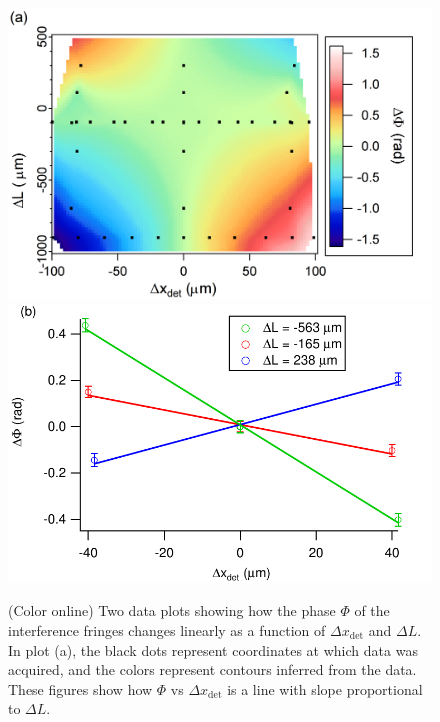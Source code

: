 \documentclass[twocolumn,pra,showpacs,superscriptaddress,longbibliography]{revtex4-1}   %
\begin{document}
\begin{figure}
\includegraphics[scale=0.5]{phaseVsdxDetdLSurf_141202.png}
\includegraphics[width=\linewidth,keepaspectratio]{phaseVsdxDet_150420.pdf}
\caption{\label{PhaseVsThings}(Color online) Two data plots showing how the phase $\Phi$ of the interference fringes changes linearly as a function of $\Delta x_{\mathrm{det}}$ and $\Delta L$.
In plot (a), the black dots represent coordinates at which data was acquired, and the colors represent contours inferred from the data.
These figures show how $\Phi$ vs $\Delta x_{\mathrm{det}}$ is a line with slope proportional to $\Delta L$. 
}
\end{figure}
\end{document}
